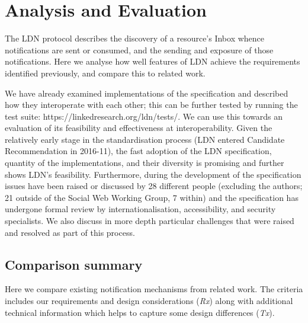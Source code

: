 \documentclass[a4paper]{llncs}
\begin{document}
                    
                        \section{Analysis and Evaluation}
  \label{analysis-and-evaluation}

                        
                            
\par The LDN protocol describes the discovery of a resource’s Inbox whence notifications are sent or consumed, and the sending and exposure of those notifications. Here we analyse how well features of LDN achieve the \empty requirements identified previously, and compare this to related work.

                            
\par We have already examined \empty implementations of the specification and described how they interoperate with each other; this can be further tested by running the \empty test suite: https://linkedresearch.org/ldn/tests/. We can use this towards an evaluation of its feasibility and effectiveness at interoperability. Given the relatively early stage in the standardisation process (LDN entered Candidate Recommendation in 2016-11), the fast adoption of the LDN specification, quantity of the implementations, and their diversity is promising and further shows LDN’s feasibility. Furthermore, during the development of the specification issues have been raised or discussed by 28 different people (excluding the authors; 21 outside of the Social Web Working Group, 7 within) and the specification has undergone formal review by internationalisation, accessibility, and security specialists. We also discuss in more depth particular challenges that were raised and resolved as part of this process.

                            
                                \subsection{Comparison summary}
  \label{comparison-summary}

                                
                                    
\par Here we compare existing notification mechanisms from related work. The criteria includes our \empty requirements and design considerations ({\em Rx}) along with additional technical information which helps to capture some design differences ({\em Tx}).
\end{document}
